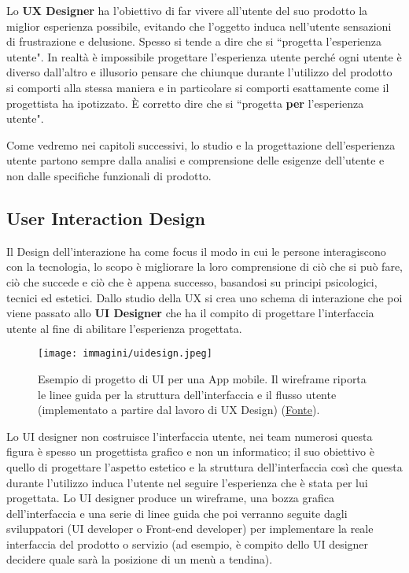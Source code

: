 
Lo \textbf{UX Designer} ha l'obiettivo di far vivere all'utente del suo prodotto la miglior esperienza possibile, evitando che l'oggetto
induca nell'utente sensazioni di frustrazione e delusione. Spesso si tende a dire che si ``progetta l'esperienza utente". In realtà è impossibile
progettare l'esperienza utente perché ogni utente è diverso dall'altro e illusorio pensare che chiunque durante l'utilizzo del prodotto si
comporti alla stessa maniera e in particolare si comporti esattamente come il progettista ha ipotizzato. \`E corretto dire che si
``progetta \textbf{per} l'esperienza utente".

Come vedremo nei capitoli successivi, lo studio e la progettazione dell'esperienza utente partono sempre dalla analisi e comprensione delle esigenze
dell'utente e non dalle specifiche funzionali di prodotto. 

\subsection{User Interaction Design}
Il Design dell'interazione ha come focus il modo in cui le persone interagiscono con la tecnologia, lo scopo è migliorare la loro comprensione di ciò
che si può fare, ciò che succede e ciò che è appena successo, basandosi su principi psicologici, tecnici ed estetici. Dallo studio della UX si crea
uno schema di interazione che poi viene passato allo \textbf{UI Designer} che ha il compito di progettare l'interfaccia utente al fine di abilitare
l'esperienza progettata.

\begin{figure}[!ht]
	\centering
	\texttt{[image: immagini/uidesign.jpeg]}
	\caption{Esempio di progetto di UI per una App mobile. Il wireframe riporta le linee guida per la struttura dell'interfaccia e il flusso utente
	(implementato a partire dal lavoro di UX Design) (\href{https://blog.prototypr.io/why-you-shouldnt-skip-your-wireframing-1f7a70d5c125}{\underline{Fonte}}).}
\end{figure}

Lo UI designer non costruisce l'interfaccia utente, nei team numerosi questa figura è spesso un progettista grafico e non un informatico;
il suo obiettivo è quello di progettare l'aspetto estetico e la struttura dell'interfaccia così che questa durante l'utilizzo induca
l'utente nel seguire l'esperienza che è stata per lui progettata. Lo UI designer produce un wireframe, una bozza grafica dell'interfaccia e una
serie di linee guida che poi verranno seguite dagli sviluppatori (UI developer o Front-end developer) per implementare la reale interfaccia del prodotto
o servizio (ad esempio, è compito dello UI designer decidere quale sarà la posizione di un menù a tendina).


